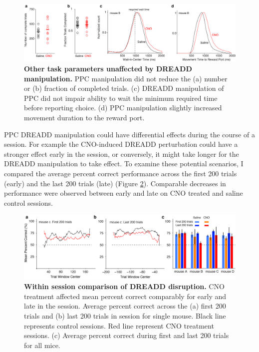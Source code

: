 \begin{figure}
  \centering
  	\includegraphics[width=\textwidth]{Figures/chapter3/non-stimulus_related_task_variables.png}
  \caption[Other task parameters unaffected by DREADD manipulation]{\textbf{Other task parameters unaffected by DREADD manipulation.} PPC manipulation  did not reduce the (a) number or (b) fraction of completed trials. (c) DREADD manipulation of PPC did not impair ability to wait the minimum required time before reporting choice. (d) PPC manipulation slightly increased movement duration to the reward port.}
   \label{fig:dreaddtaskmeasures}
\end{figure}
PPC DREADD manipulation could have differential effects during the course of a session. For example the CNO-induced DREADD perturbation could have a stronger effect early in the session, or conversely, it might take longer for the DREADD manipulation to take effect. To examine these potential scenarios, I compared the average percent correct performance across the first 200 trials (early) and the last 200 trials (late) (Figure \ref{fig:dreaddinsession}). Comparable decreases in performance were observed between early and late on CNO treated and saline control sessions.\par 
\begin{figure}
  \centering
  	\includegraphics[width=\textwidth]{Figures/chapter3/within_session_comparison.png}
  \caption[Within session comparison of DREADD disruption]{\textbf{Within session comparison of DREADD disruption.} CNO treatment affected mean percent correct comparably for early and late in the session. Average percent correct across the (a) first 200 trials and (b) last 200 trials in session for single mouse. Black line represents control sessions. Red line represent CNO treatment sessions. (c) Average percent correct during first and last 200 trials for all mice.} 
   \label{fig:dreaddinsession}
\end{figure}

